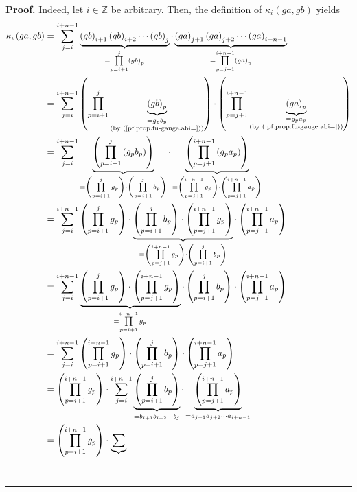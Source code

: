 \documentclass[numbers=enddot,12pt,final,onecolumn,notitlepage]{scrartcl}%
\theoremstyle{definition}
\newenvironment{proof}[1][Proof]{\noindent\textbf{#1.} }{\ \rule{0.5em}{0.5em}}
\let\sumnonlimits\sum
\let\prodnonlimits\prod
\renewcommand{\sum}{\sumnonlimits\limits}
\renewcommand{\prod}{\prodnonlimits\limits}
\newenvironment{verlong}{}{}
\begin{document}
\begin{verlong}
\begin{proof}
Indeed, let $i\in\mathbb{Z}$ be arbitrary. Then, the definition of $\kappa
_{i}\left(  ga,gb\right)  $ yields%
\begin{align}
\kappa_{i}\left(  ga,gb\right)    & =\sum_{j=i}^{i+n-1}\underbrace{\left(
gb\right)  _{i+1}\left(  gb\right)  _{i+2}\cdots\left(  gb\right)  _{j}%
}_{=\prod_{p=i+1}^{j}\left(  gb\right)  _{p}}\cdot\underbrace{\left(
ga\right)  _{j+1}\left(  ga\right)  _{j+2}\cdots\left(  ga\right)  _{i+n-1}%
}_{=\prod_{p=j+1}^{i+n-1}\left(  ga\right)  _{p}}\nonumber\\
& =\sum_{j=i}^{i+n-1}\left(  \prod_{p=i+1}^{j}\underbrace{\left(  gb\right)
_{p}}_{\substack{=g_{p}b_{p}\\\text{(by (\ref{pf.prop.fu-gauge.abi=}))}%
}}\right)  \cdot\left(  \prod_{p=j+1}^{i+n-1}\underbrace{\left(  ga\right)
_{p}}_{\substack{=g_{p}a_{p}\\\text{(by (\ref{pf.prop.fu-gauge.abi=}))}%
}}\right)  \nonumber\\
& =\sum_{j=i}^{i+n-1}\underbrace{\left(  \prod_{p=i+1}^{j}\left(  g_{p}%
b_{p}\right)  \right)  }_{=\left(  \prod_{p=i+1}^{j}g_{p}\right)  \cdot\left(
\prod_{p=i+1}^{j}b_{p}\right)  }\cdot\underbrace{\left(  \prod_{p=j+1}%
^{i+n-1}\left(  g_{p}a_{p}\right)  \right)  }_{=\left(  \prod_{p=j+1}%
^{i+n-1}g_{p}\right)  \cdot\left(  \prod_{p=j+1}^{i+n-1}a_{p}\right)
}\nonumber\\
& =\sum_{j=i}^{i+n-1}\left(  \prod_{p=i+1}^{j}g_{p}\right)  \cdot
\underbrace{\left(  \prod_{p=i+1}^{j}b_{p}\right)  \cdot\left(  \prod
_{p=j+1}^{i+n-1}g_{p}\right)  }_{=\left(  \prod_{p=j+1}^{i+n-1}g_{p}\right)
\cdot\left(  \prod_{p=i+1}^{j}b_{p}\right)  }\cdot\left(  \prod_{p=j+1}%
^{i+n-1}a_{p}\right)  \nonumber\\
& =\sum_{j=i}^{i+n-1}\underbrace{\left(  \prod_{p=i+1}^{j}g_{p}\right)
\cdot\left(  \prod_{p=j+1}^{i+n-1}g_{p}\right)  }_{=\prod_{p=i+1}^{i+n-1}%
g_{p}}\cdot\left(  \prod_{p=i+1}^{j}b_{p}\right)  \cdot\left(  \prod
_{p=j+1}^{i+n-1}a_{p}\right)  \nonumber\\
& =\sum_{j=i}^{i+n-1}\left(  \prod_{p=i+1}^{i+n-1}g_{p}\right)  \cdot\left(
\prod_{p=i+1}^{j}b_{p}\right)  \cdot\left(  \prod_{p=j+1}^{i+n-1}a_{p}\right)
\nonumber\\
& =\left(  \prod_{p=i+1}^{i+n-1}g_{p}\right)  \cdot\sum_{j=i}^{i+n-1}%
\underbrace{\left(  \prod_{p=i+1}^{j}b_{p}\right)  }_{=b_{i+1}b_{i+2}\cdots
b_{j}}\cdot\underbrace{\left(  \prod_{p=j+1}^{i+n-1}a_{p}\right)  }%
_{=a_{j+1}a_{j+2}\cdots a_{i+n-1}}\nonumber\\
& =\left(  \prod_{p=i+1}^{i+n-1}g_{p}\right)  \cdot\underbrace{\sum
}
\end{align}
\end{proof}
\end{verlong}
\end{document}

